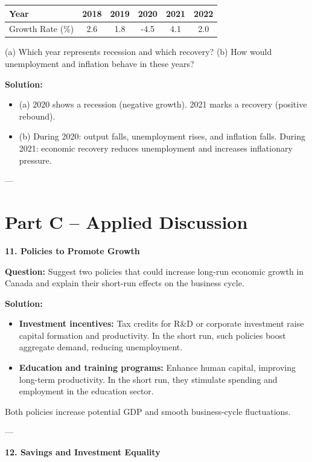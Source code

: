 \documentclass[12pt]{article}
\begin{document}
\begin{center}
\begin{tabular}{@{}lccccc@{}}
\toprule
Year & 2018 & 2019 & 2020 & 2021 & 2022 \\ \midrule
Growth Rate (\%) & 2.6 & 1.8 & -4.5 & 4.1 & 2.0 \\ \bottomrule
\end{tabular}
\end{center}

(a) Which year represents recession and which recovery?  
(b) How would unemployment and inflation behave in these years?

\textbf{Solution:}
\begin{itemize}
    \item (a) 2020 shows a recession (negative growth). 2021 marks a recovery (positive rebound).
    \item (b) During 2020: output falls, unemployment rises, and inflation falls. During 2021: economic recovery reduces unemployment and increases inflationary pressure.
\end{itemize}

---

\section*{Part C – Applied Discussion}

\textbf{11. Policies to Promote Growth}

\textbf{Question:}  
Suggest two policies that could increase long-run economic growth in Canada and explain their short-run effects on the business cycle.

\textbf{Solution:}
\begin{itemize}
    \item \textbf{Investment incentives:} Tax credits for R\&D or corporate investment raise capital formation and productivity. In the short run, such policies boost aggregate demand, reducing unemployment.
    \item \textbf{Education and training programs:} Enhance human capital, improving long-term productivity. In the short run, they stimulate spending and employment in the education sector.
\end{itemize}

Both policies increase potential GDP and smooth business-cycle fluctuations.

---

\textbf{12. Savings and Investment Equality}
\end{document}
